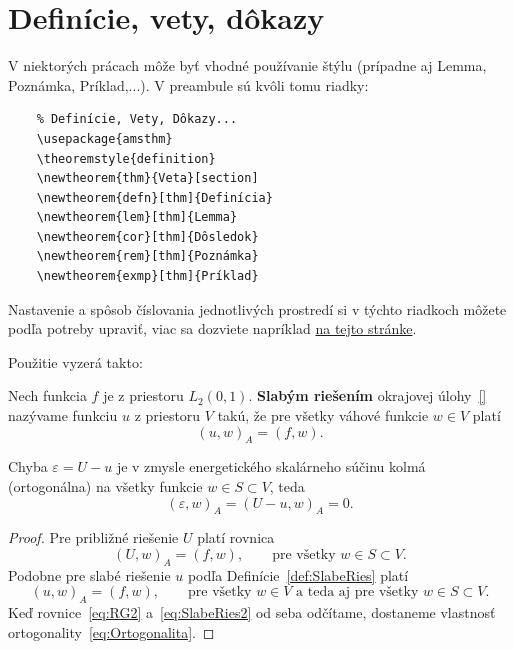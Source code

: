 \section{Definície, vety, dôkazy}
V niektorých prácach môže byť vhodné používanie štýlu  (prípadne aj Lemma, Poznámka, Príklad,...). V preambule sú kvôli tomu riadky:
\begin{verbatim}
	% Definície, Vety, Dôkazy...
	\usepackage{amsthm}
	\theoremstyle{definition}
	\newtheorem{thm}{Veta}[section]
	\newtheorem{defn}[thm]{Definícia}
	\newtheorem{lem}[thm]{Lemma}
	\newtheorem{cor}[thm]{Dôsledok}
	\newtheorem{rem}[thm]{Poznámka}
	\newtheorem{exmp}[thm]{Príklad}
\end{verbatim}
Nastavenie a spôsob číslovania jednotlivých prostredí si v týchto riadkoch môžete podľa potreby upraviť, viac sa dozviete napríklad \href{https://www.overleaf.com/learn/latex/Theorems_and_proofs}{na tejto stránke}.

Použitie vyzerá takto:

\begin{defn}\label{def:SlabeRies}
	Nech funkcia $f$ je z priestoru $L_2(0,1)$. \textbf{Slabým riešením} okrajovej úlohy~\eqref{} nazývame funkciu $u$ z priestoru $V$ takú, že pre všetky váhové funkcie $w\in V$ platí
	\begin{equation*}
		(u,w)_A=(f,w).
	\end{equation*}
\end{defn}
\begin{thm}
	Chyba  $\varepsilon=U-u$ je v zmysle energetického skalárneho súčinu kolmá (ortogonálna) na všetky funkcie $w\in S \subset V$, teda
	\begin{equation}\label{eq:Ortogonalita}
		(\varepsilon,w)_A=(U-u,w)_A=0.
	\end{equation}
\end{thm}
\begin{proof}
	Pre približné riešenie $U$ platí rovnica
	\begin{equation}\label{eq:RG2}
		(U,w)_A=(f,w),\qquad \mbox{pre všetky } w \in S\subset V.
	\end{equation}
	Podobne pre slabé riešenie $u$ podľa Definície~\ref{def:SlabeRies} platí
	\begin{equation}\label{eq:SlabeRies2}
		(u,w)_A=(f,w),\qquad \mbox{pre všetky } w \in V \mbox{ a teda aj pre všetky } w \in S\subset V.
	\end{equation}
	Keď rovnice~\eqref{eq:RG2} a~\eqref{eq:SlabeRies2} od seba odčítame, dostaneme vlastnosť ortogonality~\eqref{eq:Ortogonalita}.
\end{proof}


